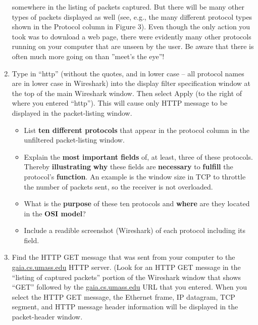 \documentclass[11pt,a4paper]{article}
\begin{document}
\begin{enumerate}
    somewhere in the listing of packets captured. But there will be many other types
    of packets displayed as well (see, e.g., the many different protocol types shown in
    the Protocol column in Figure 3). Even though the only action you took was to
    download a web page, there were evidently many other protocols running on your
    computer that are unseen by the user. Be aware that there is often much more going on than ''meet’s the eye''!
    \item Type in ``http'' (without the quotes, and in lower case – all protocol names are in
    lower case in Wireshark) into the display filter specification window at the top of
    the main Wireshark window. Then select Apply (to the right of where you entered
    ``http''). This will cause only HTTP message to be displayed in the packet-listing
    window.
    
    \begin{question}
        \begin{itemize}
            \item List \textbf{ten different protocols} that appear in the protocol column in the unfiltered packet-listing window.
            \item Explain the \textbf{most important fields} of, at least, three of these protocols. 
            Thereby \textbf{illustrating} \textbf{why} these fields are \textbf{necessary} to \textbf{fulfill} the protocol's 
            \textbf{function}. An example is the window size in TCP to throttle the number of packets sent, so the receiver is 
            not overloaded.
            \item What is the \textbf{purpose} of these ten protocols and \textbf{where} are they located in the \textbf{OSI model}?
            \item  Include a readible screenshot (Wireshark) of each protocol including its field.
        \end{itemize}
        
       
    \end{question}%
    
    
    
    
    \item Find the HTTP GET message that was sent from your computer to the
    \url{gaia.cs.umass.edu} HTTP server. (Look for an HTTP GET message in the ``listing
    of captured packets'' portion of the Wireshark window  that shows
    ``GET'' followed by the \url{gaia.cs.umass.edu} URL that you entered. When you
    select the HTTP GET message, the Ethernet frame, IP datagram, TCP segment,
    and HTTP message header information will be displayed in the packet-header
    window. 
\end{enumerate}
\end{document}
